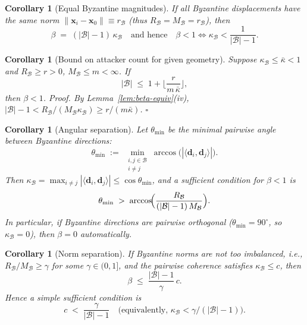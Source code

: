 \documentclass{article}
\theoremstyle{plain}
\newtheorem{corollary}[theorem]{Corollary}
\theoremstyle{definition}
\theoremstyle{remark}
\newcommand{\vx}{\bm{x}}
\newcommand{\vd}{\bm{d}}
\newcommand{\cB}{\mathcal{B}}
\begin{document}
\begin{corollary}[Equal Byzantine magnitudes]
\label{cor:equal-norms}
If all Byzantine displacements have the same norm
$\|\vx_i-\vx_0\|\equiv r_{\cB}$ (thus $R_{\cB}=M_{\cB}=r_{\cB}$), then
\[
\beta \;=\; (|\cB|-1)\,\kappa_{\cB}
\quad\text{and hence}\quad
\beta<1 \iff \kappa_{\cB} < \frac{1}{|\cB|-1}.
\]
\end{corollary}

\begin{corollary}[Bound on attacker count for given geometry]
\label{cor:count}
Suppose $\kappa_{\cB}\le \bar\kappa<1$ and $R_{\cB}\ge r>0$, $M_{\cB}\le m<\infty$.
If
\[
|\cB| \;\le\; 1 + \Big\lfloor \frac{r}{m\,\bar\kappa}\Big\rfloor,
\]
then $\beta<1$.
\emph{Proof.} By Lemma~\ref{lem:beta-equiv}(iv),
$|\cB|-1 < R_{\cB}/(M_{\cB}\kappa_{\cB})\ge r/(m\bar\kappa)$.
\hfill\(\square\)
\end{corollary}

\begin{corollary}[Angular separation]
\label{cor:angle}
Let $\theta_{\min}$ be the minimal pairwise angle between Byzantine directions:
\[
\theta_{\min} \;:=\; \min_{\substack{i,j\in \cB\\ i\neq j}}
\arccos\bigl(|\langle \vd_i,\vd_j\rangle|\bigr).
\]
Then $\kappa_{\cB}=\max_{i\neq j}|\langle \vd_i,\vd_j\rangle|\le \cos\theta_{\min}$, and a sufficient condition for $\beta<1$ is
\[
\theta_{\min} \;>\;
\arccos\!\Bigl(\frac{R_{\cB}}{(|\cB|-1)\,M_{\cB}}\Bigr).
\]
In particular, if Byzantine directions are pairwise orthogonal
($\theta_{\min}=90^\circ$, so $\kappa_{\cB}=0$), then $\beta=0$ automatically.
\end{corollary}

\begin{corollary}[Norm separation]
\label{cor:norm-sep}
If Byzantine norms are not too imbalanced, i.e.,
$R_{\cB}/M_{\cB} \ge \gamma$ for some $\gamma\in(0,1]$, and the pairwise coherence satisfies $\kappa_{\cB}\le c$, then
\[
\beta \;\le\; \frac{|\cB|-1}{\gamma}\,c.
\]
Hence a simple sufficient condition is
\[
c \;<\; \frac{\gamma}{|\cB|-1}
\quad\text{(equivalently, }\kappa_{\cB} < \gamma/(|\cB|-1)\text{)}.
\]
\end{corollary}
\end{document}
